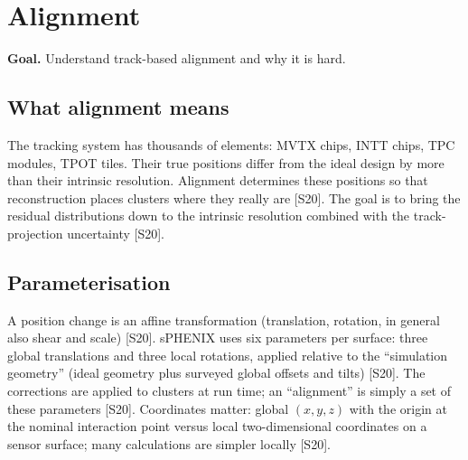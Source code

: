 \documentclass[11pt,letterpaper]{article}
\newcommand{\goal}[1]{\par\noindent\textbf{Goal.} #1\par}
\begin{document}
\section{Alignment}\label{sec:align}
\goal{Understand track-based alignment and why it is hard.}

\subsection{What alignment means}
The tracking system has thousands of elements: MVTX chips, INTT chips, TPC modules, TPOT tiles. Their true positions differ from the ideal design by more than their intrinsic resolution.
Alignment determines these positions so that reconstruction places clusters where they really are [S20].
The goal is to bring the residual distributions down to the intrinsic resolution combined with the track-projection uncertainty [S20].

\subsection{Parameterisation}
A position change is an affine transformation (translation, rotation, in general also shear and scale) [S20].
sPHENIX uses six parameters per surface: three global translations and three local rotations, applied relative to the ``simulation geometry'' (ideal geometry plus surveyed global offsets and tilts) [S20].
The corrections are applied to clusters at run time; an ``alignment'' is simply a set of these parameters [S20].
Coordinates matter: global $(x,y,z)$ with the origin at the nominal interaction point versus local two-dimensional coordinates on a sensor surface; many calculations are simpler locally [S20].
\end{document}
